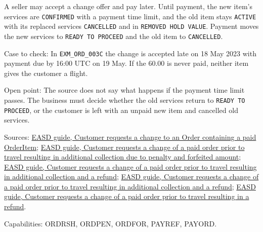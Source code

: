\begin{definition}
  \label{def:change-cancellation-deferred-payment-change}
  \notready
  A seller may accept a change offer and pay later. Until payment, the new
  item's services are \texttt{CONFIRMED} with a payment time limit, and the
  old item stays \texttt{ACTIVE} with its replaced services
  \texttt{CANCELLED} and in \texttt{REMOVED HOLD VALUE}. Payment moves the
  new services to \texttt{READY TO PROCEED} and the old item to
  \texttt{CANCELLED}.

  Case to check: In \texttt{EXM\_ORD\_003C} the change is accepted late on
  18 May 2023 with payment due by 16:00 UTC on 19 May. If the 60.00 is never
  paid, neither item gives the customer a flight.

  Open point: The source does not say what happens if the payment time limit
  passes. The business must decide whether the old services return to
  \texttt{READY TO PROCEED}, or the customer is left with an unpaid new item
  and cancelled old services.

  Sources: \href{https://standards.atlassian.net/wiki/spaces/EASD/pages/842268673}{EASD guide, Customer requests a change to an Order containing a paid OrderItem};
  \href{https://standards.atlassian.net/wiki/spaces/EASD/pages/842268745}{EASD guide, Customer requests a change of a paid order prior to travel resulting in additional collection due to penalty and forfeited amount};
  \href{https://standards.atlassian.net/wiki/spaces/EASD/pages/842301447}{EASD guide, Customer requests a change of a paid order prior to travel resulting in additional collection and a refund};
  \href{https://standards.atlassian.net/wiki/spaces/EASD/pages/842301447/Customer+requests+a+change+of+a+paid+order+prior+to+travel+resulting+in+additional+collection+and+a+refund}{EASD guide, Customer requests a change of a paid order prior to travel resulting in additional collection and a refund};
  \href{https://standards.atlassian.net/wiki/spaces/EASD/pages/842268768/Customer+requests+a+change+of+a+paid+order+prior+to+travel+resulting+in+a+refund}{EASD guide, Customer requests a change of a paid order prior to travel resulting in a refund}.

  Capabilities: ORDRSH, ORDPEN, ORDFOR, PAYREF, PAYORD.
\end{definition}

